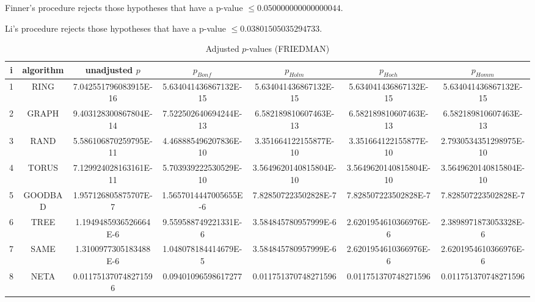 \documentclass[a4paper,10pt]{article}
\begin{document}
\begin{landscape}
Finner's procedure rejects those hypotheses that have a p-value $\le0.050000000000000044$.


Li's procedure rejects those hypotheses that have a p-value $\le0.03801505035294733$.



\newpage

\begin{table}[!htp]
\centering\scriptsize
\caption{Adjusted $p$-values (FRIEDMAN)}
\begin{tabular}{ccccccc}
i&algorithm&unadjusted $p$&$p_{Bonf}$&$p_{Holm}$&$p_{Hoch}$&$p_{Homm}$\\
\hline
1& RING&7.042551796083915E-16&5.634041436867132E-15&5.634041436867132E-15&5.634041436867132E-15&5.634041436867132E-15\\
2& GRAPH&9.403128300867804E-14&7.522502640694244E-13&6.582189810607463E-13&6.582189810607463E-13&6.582189810607463E-13\\
3& RAND&5.586106870259795E-11&4.468885496207836E-10&3.351664122155877E-10&3.351664122155877E-10&2.7930534351298975E-10\\
4& TORUS&7.129924028163161E-11&5.703939222530529E-10&3.5649620140815804E-10&3.5649620140815804E-10&3.5649620140815804E-10\\
5& GOODBAD&1.957126805875707E-7&1.5657014447005655E-6&7.828507223502828E-7&7.828507223502828E-7&7.828507223502828E-7\\
6& TREE&1.1949485936526664E-6&9.559588749221331E-6&3.584845780957999E-6&2.6201954610366976E-6&2.3898971873053328E-6\\
7& SAME&1.3100977305183488E-6&1.048078184414679E-5&3.584845780957999E-6&2.6201954610366976E-6&2.6201954610366976E-6\\
8& NETA&0.011751370748271596&0.09401096598617277&0.011751370748271596&0.011751370748271596&0.011751370748271596\\
\hline
\end{tabular}
\end{table}


\end{landscape}
\end{document}
